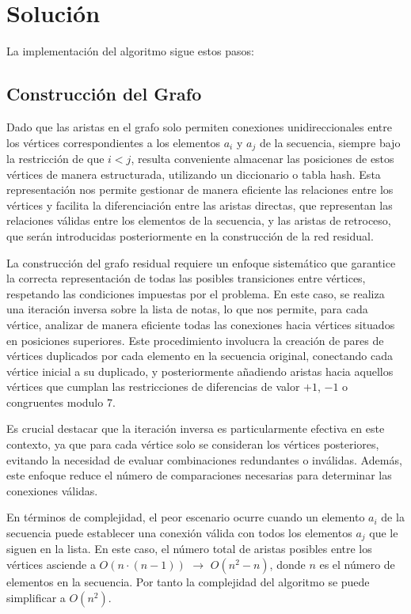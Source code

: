 \documentclass{article}
\begin{document}
\section{Solución}

La implementación del algoritmo sigue estos pasos:

\subsection{Construcción del Grafo}

Dado que las aristas en el grafo solo permiten conexiones unidireccionales entre los vértices correspondientes a los elementos $a_i$ y $a_j$ de la secuencia, siempre bajo la restricción de que $i < j$, resulta conveniente almacenar las posiciones de estos vértices de manera estructurada, utilizando un diccionario o tabla hash. Esta representación nos permite gestionar de manera eficiente las relaciones entre los vértices y facilita la diferenciación entre las aristas directas, que representan las relaciones válidas entre los elementos de la secuencia, y las aristas de retroceso, que serán introducidas posteriormente en la construcción de la red residual.

La construcción del grafo residual requiere un enfoque sistemático que garantice la correcta representación de todas las posibles transiciones entre vértices, respetando las condiciones impuestas por el problema. En este caso, se realiza una iteración inversa sobre la lista de notas, lo que nos permite, para cada vértice, analizar de manera eficiente todas las conexiones hacia vértices situados en posiciones superiores. Este procedimiento involucra la creación de pares de vértices duplicados por cada elemento en la secuencia original, conectando cada vértice inicial a su duplicado, y posteriormente añadiendo aristas hacia aquellos vértices que cumplan las restricciones de diferencias de valor $+1$, $-1$ o congruentes modulo 7.

Es crucial destacar que la iteración inversa es particularmente efectiva en este contexto, ya que para cada vértice solo se consideran los vértices posteriores, evitando la necesidad de evaluar combinaciones redundantes o inválidas. Además, este enfoque reduce el número de comparaciones necesarias para determinar las conexiones válidas.

En términos de complejidad, el peor escenario ocurre cuando un elemento $a_i$ de la secuencia puede establecer una conexión válida con todos los elementos $a_j$ que le siguen en la lista. En este caso, el número total de aristas posibles entre los vértices asciende a  $O(n \cdot (n - 1))$ $\rightarrow$ $O(n^2 - n)$, donde $n$ es el número de elementos en la secuencia. Por tanto la complejidad del algoritmo se puede simplificar a $O(n^2)$.
\end{document}
